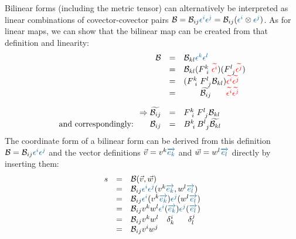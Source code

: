 Bilinear forms (including the metric tensor) can alternatively be interpreted as linear
combinations of covector-covector pairs $\mathcal{B} = \mathcal{B}_{ij}
\hdcbvc{i}\hdcbvc{j} = \mathcal{B}_{ij} (\hdcbvc{i} \otimes\hdcbvc{j})$. As for linear
maps, we can show that the bilinear map can be created from that definition and linearity:
\begin{equation}
    \begin{array}{rcl}
        \mathcal{B} & = & \mathcal{B}_{kl} \hdcbvc{k}\hdcbvc{l} \\
        & = & \mathcal{B}_{kl}(F^{k~}_{~i}\hdcbtvc{i})(F^{l~}_{~j}\hdcbtvc{j}) \\
        & = & (F^{k~}_{~i}  F^{l~}_{~j} \mathcal{B}_{kl})\hdcbtvc{i}\hdcbtvc{j} \\
        & = & \qquad \widetilde{\mathcal{B}_{ij}} \qquad\! \hdcbtvc{i}\hdcbtvc{j} \\
        \noalign{\vskip10pt}
        \Rightarrow \widetilde{\mathcal{B}_{ij}} & = & F^{k~}_{~i}  F^{l~}_{~j} \mathcal{B}_{kl} \\
        \text{and correspondingly:} \qquad\mathcal{B}_{ij}
        & = & B^{k~}_{~i}  B^{l~}_{~j} \widetilde{\mathcal{B}_{kl}}
    \end{array}
\end{equation}
The coordinate form of a bilinear form can be derived from this definition $\mathcal{B} =
\mathcal{B}_{ij} \hdcbvc{i}\hdcbvc{j}$ and the vector definitions $\vec{v} = v^k \hdbv{k}$
and $\vec{w} = w^l \hdbv{l}$ directly by inserting them:
\begin{equation}
    \begin{array}{rcl}
        s & = & \mathcal{B}(\vec{v},\vec{w}) \\
        & = & \mathcal{B}_{ij}\hdcbvc{i}\hdcbvc{j}(v^k \hdbv{k},w^l \hdbv{l}) \\
        & = & \mathcal{B}_{ij}\hdcbvc{i}(v^k \hdbv{k})\hdcbvc{j}(w^l \hdbv{l}) \\
        & = & \mathcal{B}_{ij}v^k w^l \hdcbvc{i}(\hdbv{k})\hdcbvc{j}(\hdbv{l}) \\
        & = & \mathcal{B}_{ij}v^k w^l \quad \delta^i_k \qquad\!\! \delta^j_l \\
        & = & \mathcal{B}_{ij}v^i w^j 
    \end{array}
\end{equation} \\

